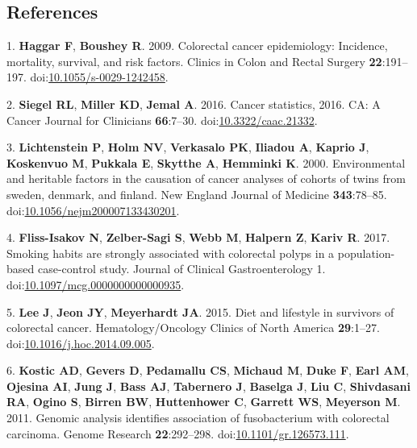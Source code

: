 \documentclass[11pt,]{article}
\begin{document}
\subsection{References}\label{references}

\hypertarget{refs}{}
\hypertarget{ref-Haggar2009}{}
1. \textbf{Haggar F}, \textbf{Boushey R}. 2009. Colorectal cancer
epidemiology: Incidence, mortality, survival, and risk factors. Clinics
in Colon and Rectal Surgery \textbf{22}:191--197.
doi:\href{https://doi.org/10.1055/s-0029-1242458}{10.1055/s-0029-1242458}.

\hypertarget{ref-Siegel2016}{}
2. \textbf{Siegel RL}, \textbf{Miller KD}, \textbf{Jemal A}. 2016.
Cancer statistics, 2016. CA: A Cancer Journal for Clinicians
\textbf{66}:7--30.
doi:\href{https://doi.org/10.3322/caac.21332}{10.3322/caac.21332}.

\hypertarget{ref-Lichtenstein2000}{}
3. \textbf{Lichtenstein P}, \textbf{Holm NV}, \textbf{Verkasalo PK},
\textbf{Iliadou A}, \textbf{Kaprio J}, \textbf{Koskenvuo M},
\textbf{Pukkala E}, \textbf{Skytthe A}, \textbf{Hemminki K}. 2000.
Environmental and heritable factors in the causation of cancer analyses
of cohorts of twins from sweden, denmark, and finland. New England
Journal of Medicine \textbf{343}:78--85.
doi:\href{https://doi.org/10.1056/nejm200007133430201}{10.1056/nejm200007133430201}.

\hypertarget{ref-FlissIsakov2017}{}
4. \textbf{Fliss-Isakov N}, \textbf{Zelber-Sagi S}, \textbf{Webb M},
\textbf{Halpern Z}, \textbf{Kariv R}. 2017. Smoking habits are strongly
associated with colorectal polyps in a population-based case-control
study. Journal of Clinical Gastroenterology 1.
doi:\href{https://doi.org/10.1097/mcg.0000000000000935}{10.1097/mcg.0000000000000935}.

\hypertarget{ref-Lee2015}{}
5. \textbf{Lee J}, \textbf{Jeon JY}, \textbf{Meyerhardt JA}. 2015. Diet
and lifestyle in survivors of colorectal cancer. Hematology/Oncology
Clinics of North America \textbf{29}:1--27.
doi:\href{https://doi.org/10.1016/j.hoc.2014.09.005}{10.1016/j.hoc.2014.09.005}.

\hypertarget{ref-Kostic2011}{}
6. \textbf{Kostic AD}, \textbf{Gevers D}, \textbf{Pedamallu CS},
\textbf{Michaud M}, \textbf{Duke F}, \textbf{Earl AM}, \textbf{Ojesina
AI}, \textbf{Jung J}, \textbf{Bass AJ}, \textbf{Tabernero J},
\textbf{Baselga J}, \textbf{Liu C}, \textbf{Shivdasani RA},
\textbf{Ogino S}, \textbf{Birren BW}, \textbf{Huttenhower C},
\textbf{Garrett WS}, \textbf{Meyerson M}. 2011. Genomic analysis
identifies association of fusobacterium with colorectal carcinoma.
Genome Research \textbf{22}:292--298.
doi:\href{https://doi.org/10.1101/gr.126573.111}{10.1101/gr.126573.111}.
\end{document}
